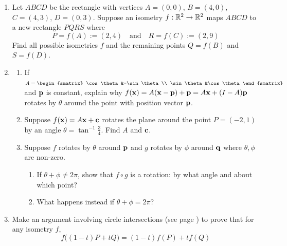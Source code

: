 \begin{exercises}
\begin{enumerate}
	
	  
	  \item Let $ABCD$ be the rectangle with vertices $A=(0,0)$, $B=(4,0)$, $C=(4,3)$, $D=(0,3)$.
		Suppose an isometry $f:\mathbb{R}^2\to\mathbb{R}^2$ maps $ABCD$ to a new rectangle $PQRS$ where
		\[
			P=f(A):=(2,4)\quad \text{and}\quad R=f(C):=(2,9)
		\]
		Find all possible isometries $f$ and the remaining points $Q=f(B)$ and $S=f(D)$.
		
		\item\label{exs:genrotref}\begin{enumerate}
		  \item If $A=
		  \begin{smatrix}
		  	\cos\theta&-\sin\theta\\
		  	\sin\theta&\cos\theta
		  \end{smatrix}$ and ${\mathbf{p}}$ is constant, explain why $f({\mathbf{x}})=A({\mathbf{x}}-{\mathbf{p}})+{\mathbf{p}}=A{\mathbf{x}}+(I-A){\mathbf{p}}$ rotates by $\theta$ around the point with position vector ${\mathbf{p}}$.
		  \item Suppose $f({\mathbf{x}})=A{\mathbf{x}}+{\mathbf{c}}$ rotates the plane around the point $P=(-2,1)$ by an angle $\theta=\tan^{-1}\frac 34$. Find $A$ and ${\mathbf{c}}$.
		  \item Suppose $f$ rotates by $\theta$ around ${\mathbf{p}}$ and $g$ rotates by $\phi$ around ${\mathbf{q}}$ where $\theta,\phi$ are non-zero.
			\begin{enumerate}
		  	\item If $\theta+\phi\neq 2\pi$, show that $f\circ g$ is a rotation: by what angle and about which point?
		  	\item What happens instead if $\theta+\phi=2\pi$?
			\end{enumerate}
		\end{enumerate}
		
		
		
		\item Make an argument involving circle intersections (see page \pageref{affinity}) to prove that for any isometry $f$,
		\[
			f\bigl((1-t)P+tQ\bigr)=(1-t)f(P)+tf(Q)
		\]
	

\end{enumerate}
\end{exercises}
